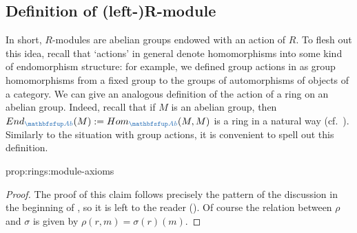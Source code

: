 \subsection{Definition of (left-)R-module}
\label{subsec:rings:definition-of-left-r-module}
In short, $R$-modules are abelian groups endowed with an action of
$R$. To flesh out this idea, recall that `actions' in general denote
homomorphisms into some kind of endomorphism structure: for example,
we defined group actions in  as group
homomorphisms from a fixed group to the groups of automorphisms of
objects of a category.  We can give an analogous definition of the
action of a ring on an abelian group. Indeed, recall that if $M$ is an
abelian group, then $\End_{\categ{Ab}}(M) := \Hom_{\categ{Ab}}(M, M)$
is a ring in a natural way (cf.\ ).   Similarly to the
situation with group actions, it is convenient to spell out this
definition.

\begin{prop}{}{prop:rings:module-axioms}
\end{prop}

\begin{proof}
  The proof of this claim follows precisely the pattern of the
  discussion in the beginning of
  , so it is left to the reader
  (). Of course the relation between
  $\rho$ and $\sigma$ is given by $\rho(r, m) = \sigma(r)(m)$.
\end{proof}

